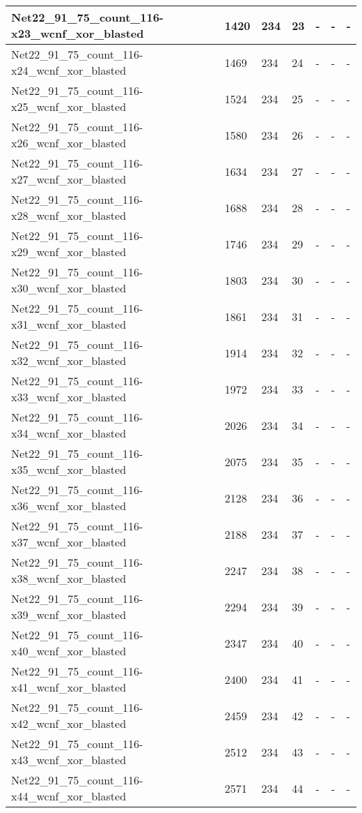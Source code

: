 \begin{scriptsize}
\begin{longtable}{|p{5cm}|l|l|l|l|l|l|}
Net22\_91\_75\_count\_116-x23\_wcnf\_xor\_blasted&1420&234&23&-&-&- \\ \hline 
Net22\_91\_75\_count\_116-x24\_wcnf\_xor\_blasted&1469&234&24&-&-&- \\ \hline 
Net22\_91\_75\_count\_116-x25\_wcnf\_xor\_blasted&1524&234&25&-&-&- \\ \hline 
Net22\_91\_75\_count\_116-x26\_wcnf\_xor\_blasted&1580&234&26&-&-&- \\ \hline 
Net22\_91\_75\_count\_116-x27\_wcnf\_xor\_blasted&1634&234&27&-&-&- \\ \hline 
Net22\_91\_75\_count\_116-x28\_wcnf\_xor\_blasted&1688&234&28&-&-&- \\ \hline 
Net22\_91\_75\_count\_116-x29\_wcnf\_xor\_blasted&1746&234&29&-&-&- \\ \hline 
Net22\_91\_75\_count\_116-x30\_wcnf\_xor\_blasted&1803&234&30&-&-&- \\ \hline 
Net22\_91\_75\_count\_116-x31\_wcnf\_xor\_blasted&1861&234&31&-&-&- \\ \hline 
Net22\_91\_75\_count\_116-x32\_wcnf\_xor\_blasted&1914&234&32&-&-&- \\ \hline 
Net22\_91\_75\_count\_116-x33\_wcnf\_xor\_blasted&1972&234&33&-&-&- \\ \hline 
Net22\_91\_75\_count\_116-x34\_wcnf\_xor\_blasted&2026&234&34&-&-&- \\ \hline 
Net22\_91\_75\_count\_116-x35\_wcnf\_xor\_blasted&2075&234&35&-&-&- \\ \hline 
Net22\_91\_75\_count\_116-x36\_wcnf\_xor\_blasted&2128&234&36&-&-&- \\ \hline 
Net22\_91\_75\_count\_116-x37\_wcnf\_xor\_blasted&2188&234&37&-&-&- \\ \hline 
Net22\_91\_75\_count\_116-x38\_wcnf\_xor\_blasted&2247&234&38&-&-&- \\ \hline 
Net22\_91\_75\_count\_116-x39\_wcnf\_xor\_blasted&2294&234&39&-&-&- \\ \hline 
Net22\_91\_75\_count\_116-x40\_wcnf\_xor\_blasted&2347&234&40&-&-&- \\ \hline 
Net22\_91\_75\_count\_116-x41\_wcnf\_xor\_blasted&2400&234&41&-&-&- \\ \hline 
Net22\_91\_75\_count\_116-x42\_wcnf\_xor\_blasted&2459&234&42&-&-&- \\ \hline 
Net22\_91\_75\_count\_116-x43\_wcnf\_xor\_blasted&2512&234&43&-&-&- \\ \hline 
Net22\_91\_75\_count\_116-x44\_wcnf\_xor\_blasted&2571&234&44&-&-&- \\ \hline 

\end{longtable}
\end{scriptsize}
